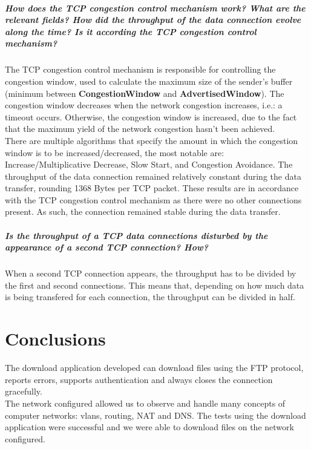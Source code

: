 \documentclass[11pt]{report}
\begin{document}
\paragraph{How does the TCP congestion control mechanism work? What are the
relevant fields? How did the throughput of the data connection evolve along
the time? Is it according the TCP congestion control mechanism?}
The TCP congestion control mechanism is responsible for controlling
the congestion window, used to calculate the maximum size of the sender's buffer
(minimum between \textbf{CongestionWindow} and \textbf{AdvertisedWindow}).
The congestion window decreases when the network congestion increases,
i.e.: a timeout occurs. Otherwise, the congestion window is increased,
due to the fact that the maximum yield of the network congestion hasn't
been achieved.\\
There are multiple algorithms that specify the amount in which the
congestion window is to be increased/decreased, the most notable are:
Increase/Multiplicative Decrease, Slow Start, and Congestion Avoidance.
The throughput of the data connection remained relatively constant
during the data transfer, rounding 1368 Bytes per TCP packet. These
results are in accordance with the TCP congestion control mechanism
as there were no other connections present. As such, the connection
remained stable during the data transfer.

\paragraph{Is the throughput of a TCP data connections disturbed by the
appearance of a second TCP connection? How?}
When a second TCP connection appears, the throughput has to be divided by
the first and second connections. This means that, depending on how much
data is being transfered for each connection, the throughput can be divided
in half.

{\let\clearpage\relax\chapter{Conclusions}}
The download application developed can download files using the FTP protocol,
reports errors, supports authentication and always closes the connection
gracefully.\\
The network configured allowed us to observe and handle many concepts of
computer networks: vlans, routing, NAT and DNS. The tests using the download
application were successful and we were able to download files on the network
configured.
\end{document}
